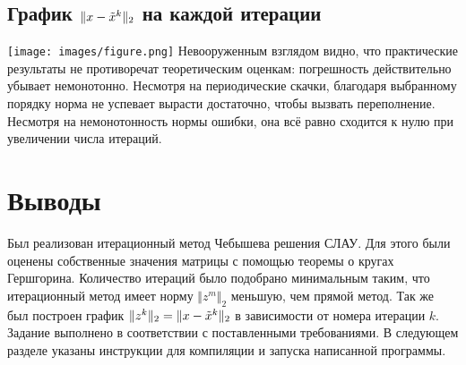\documentclass[a4paper,12pt,titlepage,final]{article}
\begin{document}
\subsection{График $\Vert x - \Tilde{x}^k \Vert_2$ на каждой итерации}

\hspace{-3.3cm}
\texttt{[image: images/figure.png]}
Невооруженным взглядом видно, что практические результаты не противоречат теоретическим оценкам: погрешность действительно убывает немонотонно. Несмотря на периодические скачки, благодаря выбранному порядку норма не успевает вырасти достаточно, чтобы вызвать переполнение. Несмотря на немонотонность нормы ошибки, она всё равно сходится к нулю при увеличении числа итераций.
\section{Выводы}
Был реализован итерационный метод Чебышева решения СЛАУ. Для этого были оценены собственные значения матрицы с помощью теоремы о кругах Гершгорина. Количество итераций было подобрано минимальным таким, что итерационный метод имеет норму $\Vert z^m \Vert_2$ меньшую, чем прямой метод. Так же был построен график $\Vert z^k \Vert_2 = \Vert x - \Tilde{x}^k \Vert_2$ в зависимости от номера итерации $k$. Задание выполнено в соответствии с поставленными требованиями. В следующем разделе указаны инструкции для компиляции и запуска написанной программы.
\end{document}
